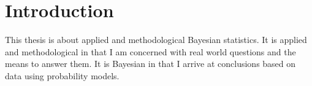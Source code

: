 \documentclass[a4paper, nobind]{templates/ociamthesis}
\begin{document}
\begin{romanpages}
  \dominitoc %

\flushbottom

\tableofcontents

\listoffigures
	\mtcaddchapter

\listoftables
  \mtcaddchapter




\end{romanpages}

\flushbottom

\hypertarget{introduction}{%
\chapter{Introduction}\label{introduction}}

\adjustmtc
{}

This thesis is about applied and methodological Bayesian statistics.
It is applied and methodological in that I am concerned with real world questions and the means to answer them.
It is Bayesian in that I arrive at conclusions based on data using probability models.
\end{document}
